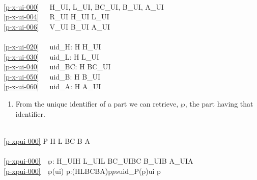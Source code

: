 \bp
{}\ \ \\
\ref{p-x-ui-000}\ \ \ H\_UI, L\_UI, BC\_UI, B\_UI, A\_UI \\
\ref{p-x-ui-004}\ \ \ R\_UI {\EQ} H\_UI {\BAR} L\_UI \\
\ref{p-x-ui-006}\ \ \ V\_UI {\EQ} B\_UI {\BAR} A\_UI \\
\\
\ref{p-x-ui-020}\ \ \ uid\_H: H {\RIGHTARROW} H\_UI \\
\ref{p-x-ui-030}\ \ \ uid\_L: H {\RIGHTARROW} L\_UI\ \  \\
\ref{p-x-ui-040}\ \ \ uid\_BC: H {\RIGHTARROW} BC\_UI\ \ \ \ \\
\ref{p-x-ui-050}\ \ \ uid\_B: H {\RIGHTARROW} B\_UI\ \ \ \\
\ref{p-x-ui-060}\ \ \ uid\_A: H {\RIGHTARROW} A\_UI\ \ 
\ep
\pos{\end{multicols}}{}

\begin{enumerate}\setei
\item \label{p-xpui-000} From the unique identifier of a part we can
                       retrieve, $\wp$, the part having that
                       identifier. 
\savei\end{enumerate}\label{p-wp}\footsize\HHHH
\bp
{} \\
\ref{p-xpui-000} P {\EQ} H {\BAR} L {\BAR} BC {\BAR} B {\BAR} A\\
\\
\ref{p-xpui-000}\ \ $\wp$: H\_UI{\RIGHTARROW}H {\BAR} L\_UI{\RIGHTARROW}L {\BAR} BC\_UI{\RIGHTARROW}BC {\BAR} B\_UI{\RIGHTARROW}B {\BAR} A\_UI{\RIGHTARROW}A\\
\ref{p-xpui-000}\ \ $\wp$(ui) {\IS}  p:(H{\BAR}L{\BAR}BC{\BAR}B{\BAR}A){\RDOT}p{\ISIN}$ps${\WEDGE}uid\_P(p){\EQ}ui  p  
\ep
\noindent

